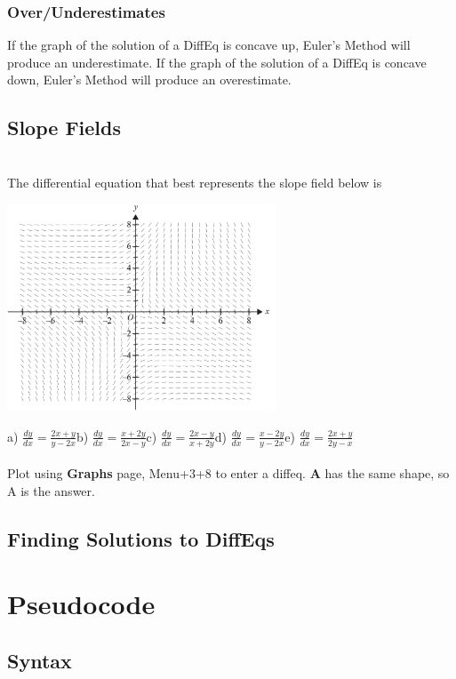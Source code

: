 \documentclass[a4paper,twoside,10pt]{article}
\newenvironment{examquestion}[1]{%
	\mbox{}\\\tcolorbox[beamer,breakable,%
	title=Exam-style Question: #1,standard jigsaw,opacityback=0, colframe=red!75!black, boxrule=2pt]}{\endtcolorbox\mbox{}\\}
\begin{document}
			\subsubsection{Over/Underestimates}
				If the graph of the solution of a DiffEq is concave up, Euler's Method will produce an underestimate. If the graph of the solution of a DiffEq is concave down, Euler's Method will produce an overestimate.
		\subsection{Slope Fields}
			\begin{examquestion}{2018 Exam 2 Question A10}
				The differential equation that best represents the slope field below is
				\begin{center}
					\includegraphics[width=8cm]{2018-2A10.png}\\
				\end{center}
				a) $\displaystyle \frac{dy}{dx}=\frac{2x+y}{y-2x}$\qquad b) $\displaystyle \frac{dy}{dx}=\frac{x+2y}{2x-y}$\qquad c) $\displaystyle \frac{dy}{dx}=\frac{2x-y}{x+2y}$\qquad d) $\displaystyle \frac{dy}{dx}=\frac{x-2y}{y-2x}$\qquad e) $\displaystyle \frac{dy}{dx}=\frac{2x+y}{2y-x}$\\\\
				Plot using \textbf{Graphs} page, Menu+3+8 to enter a diffeq. \textbf{A} has the same shape, so A is the answer.
			\end{examquestion}
		\subsection{Finding Solutions to DiffEqs}
			
	\section{Pseudocode}
		\subsection{Syntax}
\end{document}
